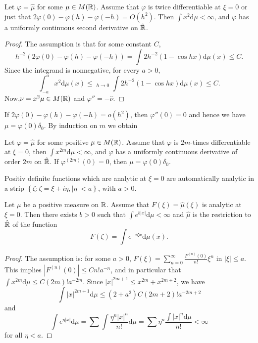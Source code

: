 \begin{lemma}
  Let $\varphi=\hat{\mu}$ for some $\mu \in M(\mathbb{R})$. Assume that $\varphi$ is twice differentiable at $\xi =0$ or just that $2\varphi(0)-\varphi(h)-\varphi(-h)=O(h^2)$. Then $\int x^2 \mathrm{d}\mu <\infty$, and $\varphi$ has a uniformly continuous second derivative on $\hat{\mathbb{R}}$.
\end{lemma}
\begin{proof}
   The assumption is that for some constant $C$,
   \[
     h^{-2}\left( 2\varphi(0)-\varphi(h)-\varphi(-h) \right) =\int 2h^{-2}\left( 1-\cos hx \right) \mathrm{d}\mu(x)\le C.
   \] Since the integrand is nonnegative, for every $a>0$,
   \[
     \int_{-a}^{a}x^2\mathrm{d}\mu(x)\le\mathop{\underline{\lim}}_{h\to 0}\int 2h^{-2}\left( 1-\cos hx \right) \mathrm{d}\mu(x)\le C.
   \]
   Now,$\nu=x^2\mu \in M(\mathbb{R})$ and $\varphi''=-\hat{\nu}$.
\end{proof}

If $2\varphi(0)-\varphi(h)-\varphi(-h)=o(h^2)$, then $\varphi''(0)=0$ and hence we have $\mu=\varphi(0)\delta_0$. By induction on $m$ we obtain

\begin{proposition}
  Let $\varphi=\hat{\mu}$ for some positive $\mu \in M(\mathbb{R})$. Assume that $\varphi$ is $2m$-times differentiable at $\xi=0$, then $\int x^{2m}\mathrm{d}\mu <\infty$, and $\varphi$ has a uniformly continuous derivative of order $2m$ on  $\hat{\mathbb{R}}$. If $\varphi^{(2m)}(0)=0$, then $\mu=\varphi(0)\delta_0$.
\end{proposition}

Positiv definite functions which are analytic at $\xi =0$ are automatically analytic in a strip $\left\{\zeta :\zeta =\xi+i\eta,|\eta|<a\right\} $, with $a>0$.

\begin{lemma}
  Let $\mu$ be a positive measure on $\mathbb{R}$. Assume that $F(\xi)=\hat{\mu}(\xi)$ is analytic at $\xi=0$. Then there exists $b>0$ such that  $\int e^{b|x|}\mathrm{d}\mu <\infty$ and $\hat{\mu}$ is the restriction to $\hat{\mathbb{R}}$ of the function
  \begin{equation}
    F(\zeta )=\int e^{-i\zeta x}\mathrm{d}\mu(x).
  \end{equation}
\end{lemma}
\begin{proof}
  The assumption is: for some $a>0$, $F(\xi)=\sum_{n=0}^{\infty} \frac{F^{(n)}(0)}{n!}\xi^{n}$ in $|\xi|\le a$. This implies $|F^{(n)}(0)|\le Cn!a^{-n}$, and in particular that $\int x^{2m}\mathrm{d}\mu \le C(2m)!a^{-2m}$. Since $|x|^{2m+1}\le x^{2m}+x^{2m+2}$, we have
  \[
    \int |x|^{2m+1}\mathrm{d}\mu \le \left( 2+a^2 \right) C(2m+2)!a^{-2m+2}
  \] and
  \begin{equation}
    \int e^{\eta|x|}\mathrm{d}\mu =\sum \int \frac{\eta^{n}|x|^{n}}{n!}\mathrm{d}\mu=\sum \eta^{n}\frac{\int |x|^{n}\mathrm{d}\mu}{n!}<\infty
  \end{equation}for all $\eta<a$.
\end{proof}


